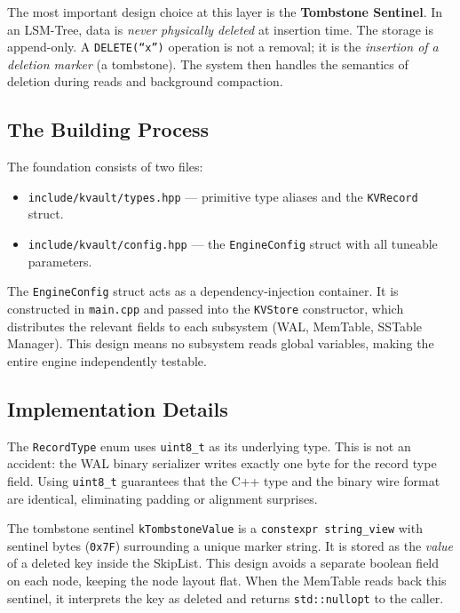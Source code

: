 \documentclass[11pt,a4paper]{article}
\begin{document}
The most important design choice at this layer is the \textbf{Tombstone
Sentinel}. In an LSM-Tree, data is \emph{never physically deleted} at
insertion time. The storage is append-only. A \texttt{DELETE(``x'')} operation
is not a removal; it is the \emph{insertion of a deletion marker}
(a tombstone). The system then handles the semantics of deletion during reads
and background compaction.

\subsection{The Building Process}

The foundation consists of two files:
\begin{itemize}[noitemsep]
    \item \texttt{include/kvault/types.hpp} --- primitive type aliases and the \texttt{KVRecord} struct.
    \item \texttt{include/kvault/config.hpp} --- the \texttt{EngineConfig} struct with all tuneable parameters.
\end{itemize}

The \texttt{EngineConfig} struct acts as a dependency-injection container. It is
constructed in \texttt{main.cpp} and passed into the \texttt{KVStore} constructor,
which distributes the relevant fields to each subsystem (WAL, MemTable, SSTable
Manager). This design means no subsystem reads global variables, making the
entire engine independently testable.

\subsection{Implementation Details}

The \texttt{RecordType} enum uses \texttt{uint8\_t} as its underlying type.
This is not an accident: the WAL binary serializer writes exactly one byte for
the record type field. Using \texttt{uint8\_t} guarantees that the C++ type
and the binary wire format are identical, eliminating padding or alignment
surprises.

The tombstone sentinel \texttt{kTombstoneValue} is a \texttt{constexpr
string\_view} with sentinel bytes (\texttt{0x7F}) surrounding a unique marker
string. It is stored as the \emph{value} of a deleted key inside the SkipList.
This design avoids a separate boolean field on each node, keeping the node
layout flat. When the MemTable reads back this sentinel, it interprets the
key as deleted and returns \texttt{std::nullopt} to the caller.
\end{document}
